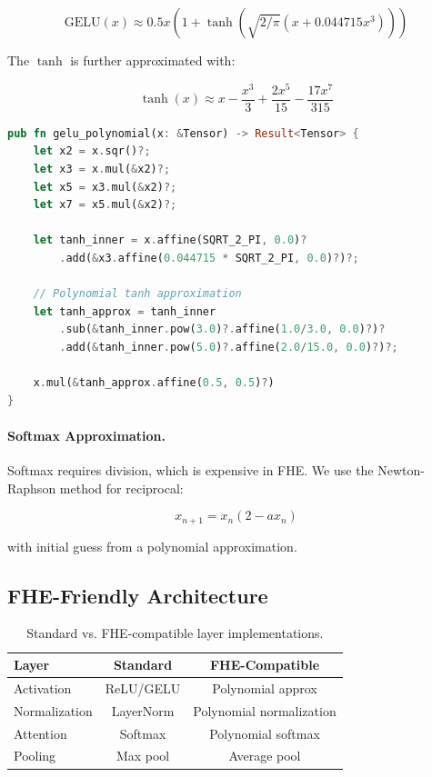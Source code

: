 \documentclass[11pt,twocolumn]{article}
\begin{document}
\begin{equation}
    \text{GELU}(x) \approx 0.5x(1 + \tanh(\sqrt{2/\pi}(x + 0.044715x^3)))
\end{equation}

The $\tanh$ is further approximated with:

\begin{equation}
    \tanh(x) \approx x - \frac{x^3}{3} + \frac{2x^5}{15} - \frac{17x^7}{315}
\end{equation}

\begin{lstlisting}[language=Rust]
pub fn gelu_polynomial(x: &Tensor) -> Result<Tensor> {
    let x2 = x.sqr()?;
    let x3 = x.mul(&x2)?;
    let x5 = x3.mul(&x2)?;
    let x7 = x5.mul(&x2)?;

    let tanh_inner = x.affine(SQRT_2_PI, 0.0)?
        .add(&x3.affine(0.044715 * SQRT_2_PI, 0.0)?)?;

    // Polynomial tanh approximation
    let tanh_approx = tanh_inner
        .sub(&tanh_inner.pow(3.0)?.affine(1.0/3.0, 0.0)?)?
        .add(&tanh_inner.pow(5.0)?.affine(2.0/15.0, 0.0)?)?;

    x.mul(&tanh_approx.affine(0.5, 0.5)?)
}
\end{lstlisting}

\paragraph{Softmax Approximation.} Softmax requires division, which is expensive in FHE. We use the Newton-Raphson method for reciprocal:

\begin{equation}
    x_{n+1} = x_n(2 - ax_n)
\end{equation}

with initial guess from a polynomial approximation.

\subsection{FHE-Friendly Architecture}

\begin{table}[h]
\centering
\caption{Standard vs. FHE-compatible layer implementations.}
\label{tab:fhe}
\begin{tabular}{lcc}
\toprule
\textbf{Layer} & \textbf{Standard} & \textbf{FHE-Compatible} \\
\midrule
Activation & ReLU/GELU & Polynomial approx \\
Normalization & LayerNorm & Polynomial normalization \\
Attention & Softmax & Polynomial softmax \\
Pooling & Max pool & Average pool \\
\bottomrule
\end{tabular}
\end{table}
\end{document}
